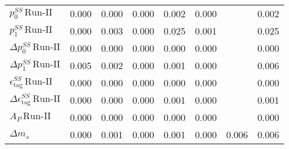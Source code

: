 \begin{tabular}{l  c  c  c  c  c  c  | c }
$p_{0}^{SS} \, \text{Run-II}$ & 0.000 & 0.000 & 0.000 & 0.002 & 0.000 &  & 0.002 \\ 
$p_{1}^{SS} \, \text{Run-II}$ & 0.000 & 0.003 & 0.000 & 0.025 & 0.001 &  & 0.025 \\ 
$\Delta p_{0}^{SS} \, \text{Run-II}$ & 0.000 & 0.000 & 0.000 & 0.000 & 0.000 &  & 0.000 \\ 
$\Delta p_{1}^{SS} \, \text{Run-II}$ & 0.005 & 0.002 & 0.000 & 0.001 & 0.000 &  & 0.006 \\ 
$\epsilon_{\text{tag}}^{SS} \, \text{Run-II}$ & 0.000 & 0.000 & 0.000 & 0.000 & 0.000 &  & 0.000 \\ 
$\Delta \epsilon_{\text{tag}}^{SS} \, \text{Run-II}$ & 0.000 & 0.000 & 0.000 & 0.001 & 0.000 &  & 0.001 \\ 
$A_{P} \, \text{Run-II}$ & 0.000 & 0.000 & 0.000 & 0.000 & 0.000 &  & 0.000 \\ 
$\Delta m_{s}$ & 0.000 & 0.001 & 0.000 & 0.001 & 0.000 & 0.006 & 0.006 \\ 
\hline
\hline
\end{tabular}
